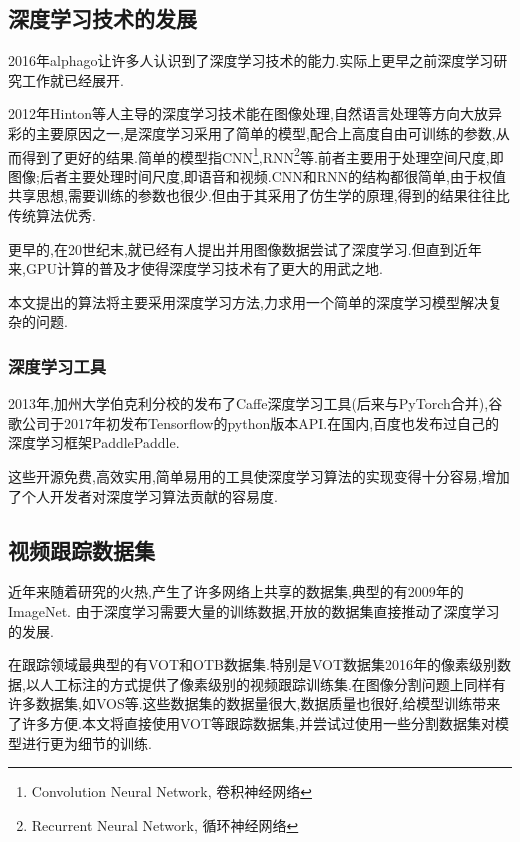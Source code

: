 \subsection{深度学习技术的发展}
2016年alphago\supercite{wang2016does}让许多人认识到了深度学习技术的能力.实际上更早之前深度学习研究工作就已经展开.
\par
2012年Hinton等人主导的深度学习技术能在图像处理,自然语言处理等方向大放异彩的主要原因之一,是深度学习采用了简单的模型,配合上高度自由可训练的参数,从而得到了更好的结果.简单的模型指CNN\footnote{Convolution Neural Network, 卷积神经网络},RNN\footnote{Recurrent Neural Network, 循环神经网络}等.前者主要用于处理空间尺度,即图像;后者主要处理时间尺度,即语音和视频.CNN和RNN的结构都很简单,由于权值共享思想,需要训练的参数也很少.但由于其采用了仿生学的原理,得到的结果往往比传统算法优秀.
\par
更早的,在20世纪末,就已经有人提出并用图像数据尝试了深度学习\supercite{lecun1998gradient}.但直到近年来,GPU计算的普及才使得深度学习技术有了更大的用武之地.
\par
本文提出的算法将主要采用深度学习方法,力求用一个简单的深度学习模型解决复杂的问题.

\subsubsection{深度学习工具}
2013年,加州大学伯克利分校的发布了Caffe\supercite{jia2014caffe}深度学习工具(后来与PyTorch\supercite{paszke2017automatic}合并),谷歌公司于2017年初发布Tensorflow\supercite{abadi2016tensorflow}的python版本API.在国内,百度也发布过自己的深度学习框架PaddlePaddle\supercite{recognize_digits_paddle}.
\par
这些开源免费,高效实用,简单易用的工具使深度学习算法的实现变得十分容易,增加了个人开发者对深度学习算法贡献的容易度.

\subsection{视频跟踪数据集}
近年来随着研究的火热,产生了许多网络上共享的数据集,典型的有2009年的ImageNet\supercite{imagenet_cvpr09}.
由于深度学习需要大量的训练数据,开放的数据集直接推动了深度学习的发展.
\par
在跟踪领域最典型的有VOT\supercite{VOT_TPAMI}和OTB\supercite{WuLimYang13}数据集.特别是VOT数据集2016年的像素级别数据\supercite{Vojir-TR-2017-01},以人工标注的方式提供了像素级别的视频跟踪训练集.在图像分割问题上同样有许多数据集,如VOS\supercite{Cae+17}等.这些数据集的数据量很大,数据质量也很好,给模型训练带来了许多方便.本文将直接使用VOT等跟踪数据集,并尝试过使用一些分割数据集对模型进行更为细节的训练.

